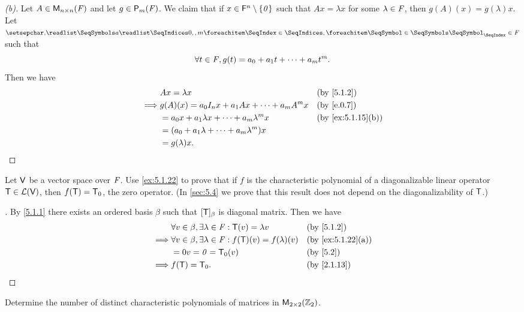 \begin{proof}[(b)]
	Let \(A \in \ms[n][n][\F]\) and let \(g \in \ps[m]{\F}\).
	We claim that if \(x \in \mathsf{F}^n \setminus \left\lbrace\mathit{0}\right\rbrace\) such that \(Ax = \lambda x\) for some \(\lambda \in \mathit{F}\), then \(g(A)(x) = g(\lambda) x\).
	Let \(\seq{a}{0,,m} \in \F\) such that
	\[
		\forall t \in \mathit{F}, g(t) = a_0 + a_1 t + \cdots + a_m t^m.
	\]
	Then we have
	\begin{align*}
		         & Ax = \lambda x                                     &  & \by{5.1.2}        \\
		\implies & g(A)(x) = a_0 I_n x + a_1 A x + \cdots + a_m A^m x &  & \by{e.0.7}        \\
		         & = a_0 x + a_1 \lambda x + \cdots + a_m \lambda^m x &  & \by{ex:5.1.15}[b] \\
		         & = (a_0 + a_1 \lambda + \cdots + a_m \lambda^m) x                          \\
		         & = g(\lambda) x.
	\end{align*}
\end{proof}

\begin{ex}\label{ex:5.1.23}
	Let \(\mathsf{V}\) be a vector space over \(\mathit{F}\).
	Use \cref{ex:5.1.22} to prove that if \(f\) is the characteristic polynomial of a diagonalizable linear operator \(\mathsf{T} \in \mathcal{L}(\mathsf{V})\), then \(f(\mathsf{T}) = \mathsf{T}_0\), the zero operator.
	(In \cref{sec:5.4} we prove that this result does not depend on the diagonalizability of \(\mathsf{T}\).)
\end{ex}

\begin{proof}[]
	By \cref{5.1.1} there exists an ordered basis \(\beta\) such that \([\mathsf{T}]_{\beta}\) is diagonal matrix.
	Then we have
	\begin{align*}
		         & \forall v \in \beta, \exists \lambda \in \F : \T(v) = \lambda v        &  & \by{5.1.2}        \\
		\implies & \forall v \in \beta, \exists \lambda \in \F : f(\T)(v) = f(\lambda)(v) &  & \by{ex:5.1.22}[a] \\
		         & = 0v = \zv = \zT(v)                                                    &  & \by{5.2}          \\
		\implies & f(\T) = \zT.                                                           &  & \by{2.1.13}
	\end{align*}
\end{proof}

\setcounter{ex}{25}
\begin{ex}\label{ex:5.1.26}
	Determine the number of distinct characteristic polynomials of matrices in \(\ms[2][2][\Z_2]\).
\end{ex}

